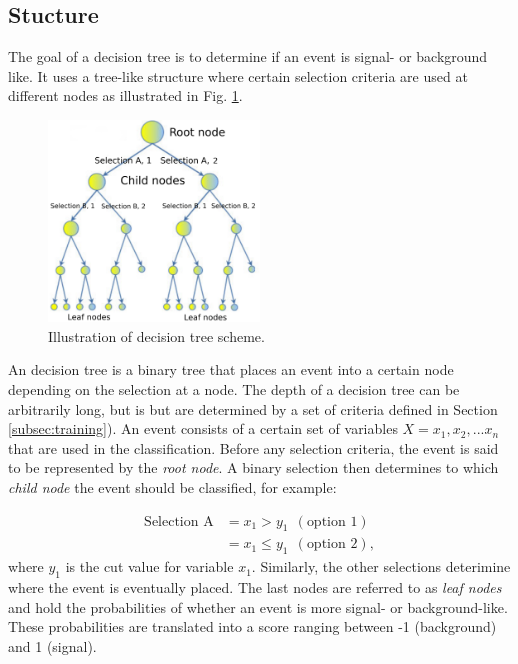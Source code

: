 \subsection{Stucture}
The goal of a decision tree is to determine if an event is signal- or background like. It uses a tree-like structure where certain selection criteria are used at different nodes as illustrated in Fig. \ref{fig:bdt}.

\begin{figure}[t]
\centering
\includegraphics[width=0.5\textwidth]{chapter7/img/bdt.png}
\caption{Illustration of decision tree scheme.}
\label{fig:bdt}
\end{figure}
An decision tree is a binary tree that places an event into a certain node depending on the selection at a node. The depth of a decision tree can be arbitrarily long, but is but are determined by a set of criteria defined in Section \ref{subsec:training}). An event consists of a certain set of variables $X = {x_1,x_2,...x_n}$ that are used in the classification. Before any selection criteria, the event is said to be represented by the \textit{root node}. A binary selection then determines to which \textit{child node} the event should be classified, for example: 

\begin{equation}
\begin{split}
\textrm{Selection A} &= x_1 > y_1 \ \ (\textrm{option 1})\\
&= x_1 \leq y_1 \ \ (\textrm{option 2}),
\end{split}
\end{equation}
where $y_1$ is the cut value for variable $x_1$. Similarly, the other selections deterimine where the event is eventually placed. The last nodes are referred to as \textit{leaf nodes} and hold the probabilities of whether an event is more signal- or background-like. These probabilities are translated into a score ranging between -1 (background) and 1 (signal). 

